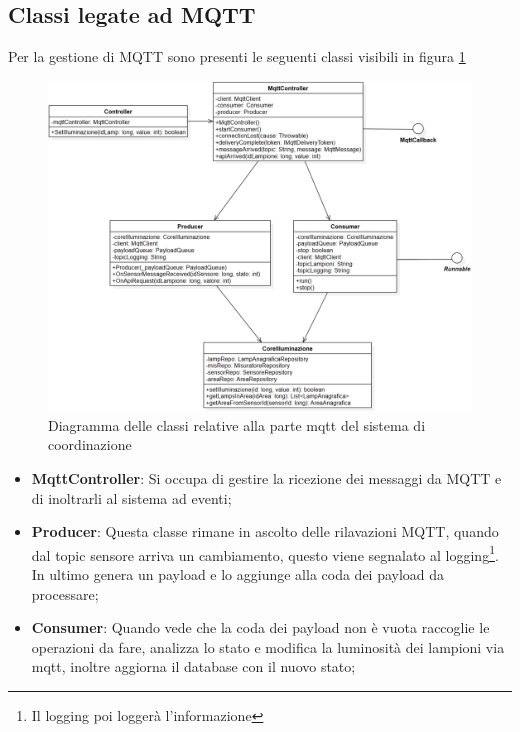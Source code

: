 \subsection{Classi legate ad MQTT}

Per la gestione di MQTT sono presenti le seguenti classi visibili in figura \ref{fig:coordinazione_mqtt}

\begin{figure}[h]
    \centering
    \includegraphics[width=\textwidth]{img/illuminazione_mqtt.png}
    \caption{Diagramma delle classi relative alla parte mqtt del sistema di coordinazione}
    \label{fig:coordinazione_mqtt}
\end{figure}


\begin{itemize}
    \item \textbf{MqttController}: Si occupa di gestire la ricezione dei messaggi da MQTT e di inoltrarli al sistema ad eventi;
    \item \textbf{Producer}: Questa classe rimane in ascolto delle rilavazioni MQTT, quando dal topic sensore arriva un cambiamento, questo viene segnalato al logging\footnote{Il logging poi loggerà l'informazione}. In ultimo genera un payload e lo aggiunge alla coda dei payload da processare;
    \item \textbf{Consumer}: Quando vede che la coda dei payload non è vuota raccoglie le operazioni da fare, analizza lo stato e modifica la luminosità dei lampioni via mqtt, inoltre aggiorna il database con il nuovo stato;
\end{itemize}

